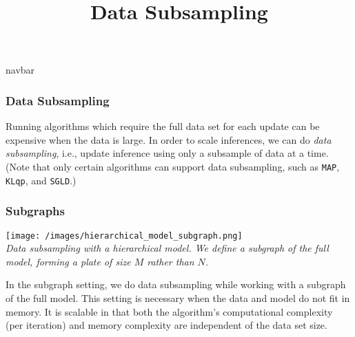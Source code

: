 \title{Data Subsampling}

{{navbar}}

\subsubsection{Data Subsampling}

Running algorithms which require the full data set for each update
can be expensive when the data is large. In order to scale inferences,
we can do \emph{data subsampling}, i.e., update inference using
only a subsample of data at a time.
(Note that only certain algorithms can support data subsampling, such as
\texttt{MAP}, \texttt{KLqp}, and \texttt{SGLD}.)

\subsubsection{Subgraphs}

\texttt{[image: /images/hierarchical\_model\_subgraph.png]} \\
{\small\textit{Data subsampling with a hierarchical model. We define
a subgraph of the full model, forming a plate of size $M$ rather than
$N$.}}

In the subgraph setting, we do data subsampling while working with a
subgraph of the full model. This setting is necessary when the data
and model do not fit in memory.
It is scalable in that both the
algorithm's computational complexity (per iteration) and memory
complexity are independent of the data set size.

